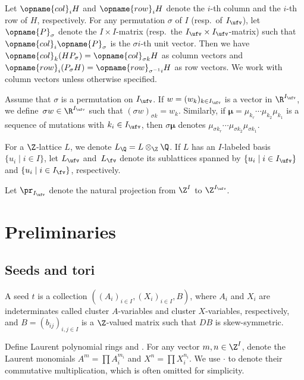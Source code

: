 \documentclass[pdftex]{sigma}
\newcommand{\Iufv}{I_{\ufv}}
\newcommand{\LP}{{\mathcal{LP}}}
\renewcommand{\Diag}{D}
\newcommand{\col}{\opname{col}}
\renewcommand{\row}{\opname{row}}
\newcommand{\seq}{\boldsymbol{\mu}}%
\newcommand{\trans}{\opname{P}}
\numberwithin{equation}{section}
\begin{document}
Let $\col_{i}H$ and $\row_{i}H$ denote the $i$-th column and the $i$-th
row of $H$, respectively. For any permutation $\sigma$ of $I$ (resp.\
of $\Iufv$), let $\trans_{\sigma}$ denote the $I\times I$-matrix
(resp.\ the $\Iufv\times\Iufv$-matrix) such that $\col_{i}\trans_{\sigma}$
is the $\sigma i$-th unit vector. Then we have $\col_{k}(HP_{\sigma})=\col_{\sigma k}H$ as column vectors and~$\row_{i}(P_{\sigma}H)=\row_{\sigma^{-1}i}H$ as row vectors. We work with column vectors unless otherwise specified.

Assume that $\sigma$ is a permutation on $\Iufv$. If $w=(w_k)_{k\in \Iufv}$ is a vector in $\R^{\Iufv}$, we define~$\sigma w\in \R^{\Iufv}$ such that $(\sigma w)_{\sigma k}= w_k$. Similarly, if $\seq=\mu_{k_{r}}\cdots\mu_{k_{2}}\mu_{k_{1}}$ is a sequence of
mutations with $k_i\in \Iufv$, then $\sigma\seq$
denotes $\mu_{\sigma k_{r}}\cdots\mu_{\sigma k_{2}}\mu_{\sigma k_{1}}$.

For a $\Z$-lattice $L$, we denote $L_{\Q}=L\otimes_{\Z}\Q$. If
$L$ has an $I$-labeled basis $\{u_{i}\mid i\in I\}$, let $L_{\ufv}$
and~$L_{\fv}$ denote its sublattices spanned by $\{u_{i}\mid i\in I_{\ufv}\}$
and $\{u_{i}\mid i\in I_{\fv}\}$, respectively.

Let $\pr_{\Iufv}$ denote the natural projection from $\Z^{I}$ to
$\Z^{\Iufv}$.

\section{Preliminaries}\label{sec:Preliminaries}

\subsection{Seeds and tori}

\begin{Definition}[seeds]
A seed $t$ is a collection $((A_{i})_{i\in I},(X_{i})_{i\in I},B)$,
where $A_{i}$ and $X_{i}$ are indeterminates called cluster $A$-variables
and cluster $X$-variables, respectively, and $B=(b_{ij})_{i,j\in I}$
is a $\Z$-valued matrix such that $\Diag B$ is skew-symmetric.
\end{Definition}

Define Laurent polynomial rings \smash{$\LP^{A}=\kk\big[A_{i}^{\pm}\big]_{i\in I}$}
and \smash{$\LP^{X}=\kk\big[X_{i}^{\pm}\big]_{i\in I}$}. For any vector $m,n\in\Z^{I}$,
denote the Laurent monomials $A^{m}=\prod A_{i}^{m_{i}}$ and $X^{n}=\prod X_{i}^{n_{i}}$. We use $\cdot$ to denote their commutative multiplication, which is often omitted for simplicity.
\end{document}
